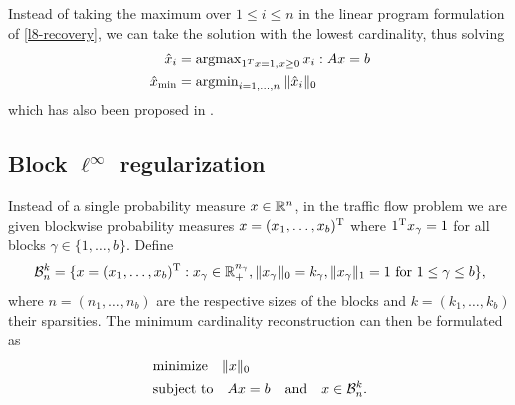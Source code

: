\documentclass{article} %
\begin{document}
Instead of taking the maximum over $1\leq i\leq n$ in the linear program formulation of \eqref{l8-recovery}, we can take the solution with the lowest cardinality, thus solving
\begin{align}
\hat{x}_i &= \operatorname{argmax}_{1^Tx =1, x\geq 0} x_i : Ax  = b \label{min-cardinality}\\
\hat{x}_{\min} &= \operatorname{argmin}_{i=1, \dots, n} \|\hat{x}_i\|_0 \nonumber
\end{align}
which has also been proposed in \cite{mert}.



\subsection{Block $\ell^\infty$ regularization}

Instead of a single probability measure $x\in \mathbb{R}^n$, in the traffic
flow problem we are given blockwise probability measures $x = (x_1,
\dots, x_b)^{\rm T}$ where $1^{\rm T} x_\gamma = 1$ for all blocks $\gamma\in
\{1, \dots, b\}$. Define
\begin{equation*}
  \mathcal B_n^k = \{x = (x_1, \dots, x_b)^{\rm T} : x_\gamma \in \mathbb{R}_+^{n_\gamma}, \lVert x_\gamma\rVert_0 = k_\gamma, \lVert x_\gamma\rVert_1 = 1\text{ for $1\leq \gamma\leq b$}\},
\end{equation*}
where $n = (n_1, \dots, n_b)$ are the respective sizes of the blocks
and $k = (k_1, \dots, k_b)$ their sparsities. The minimum cardinality
reconstruction can then be formulated as
\begin{equation}
  \begin{split}
    &\text{minimize}\quad \lVert x\rVert_0\\
    &\text{subject to}\quad Ax = b\quad\text{and}\quad x\in \mathcal B_n^k.
  \end{split}
\end{equation}
\end{document}
